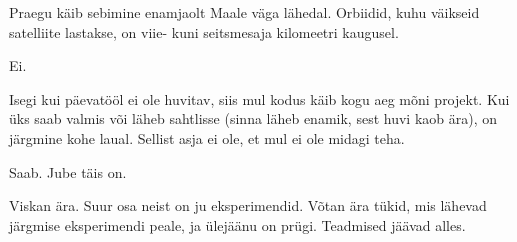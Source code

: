 
Praegu käib sebimine enamjaolt Maale väga lähedal. Orbiidid, kuhu 
väikseid satelliite lastakse, on viie- kuni seitsmesaja kilomeetri kaugusel.


Ei.


Isegi kui päevatööl ei ole huvitav, siis mul 
kodus käib kogu aeg mõni projekt. Kui üks saab valmis või läheb 
sahtlisse (sinna läheb enamik, sest huvi kaob ära), on 
järgmine kohe laual. Sellist asja ei ole, et mul ei ole midagi teha.


Saab. Jube täis on. 


Viskan ära. Suur osa neist on ju eksperimendid. Võtan ära tükid, mis lähevad  
järgmise eksperimendi peale, ja ülejäänu on prügi. Teadmised jäävad alles.
